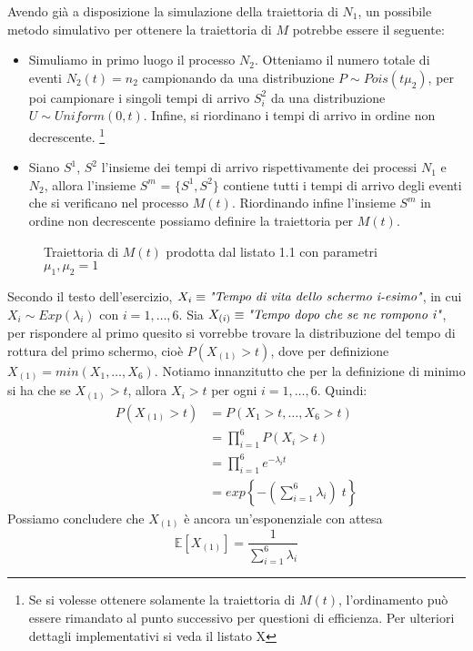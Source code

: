\documentclass{homework}
\begin{document}
\exercise*[2.c]
Avendo già a disposizione la simulazione della traiettoria di $N_1$, un possibile metodo simulativo per ottenere la traiettoria di $M$ potrebbe essere il seguente:
\begin{itemize}
    \item Simuliamo in primo luogo il processo $N_2$. Otteniamo il numero totale di eventi $N_2(t) = n_2$ campionando da una distribuzione $P \sim Pois(t \mu_2)$, per poi campionare i singoli tempi di arrivo $S^2_i$ da una distribuzione $U \sim Uniform(0, t)$. Infine, si riordinano i tempi di arrivo in ordine non decrescente.
    \footnote{Se si volesse ottenere solamente la traiettoria di $M(t)$, l'ordinamento può essere rimandato al punto successivo per questioni di efficienza. Per ulteriori dettagli implementativi si veda il listato X}
    \item Siano $S^1$, $S^2$ l'insieme dei tempi di arrivo rispettivamente dei processi $N_1$ e $N_2$, allora l'insieme $S^m$ = $\{S^1, S^2\}$  contiene tutti i tempi di arrivo degli eventi che si verificano nel processo $M(t)$.
    Riordinando infine l'insieme $S^m$ in ordine non decrescente possiamo definire la traiettoria per $M(t)$.
\end{itemize}

\begin{figure}[h]
    \centering
    
    \label{fig:my_label}
    \caption{Traiettoria di $M(t)$ prodotta dal listato 1.1 con parametri $\mu_1, \mu_2 = 1$ }
\end{figure}

\exercise*[3.a]
Secondo il testo dell'esercizio, $X_i \equiv \emph{"Tempo di vita dello schermo i-esimo"}$, in cui $X_i \sim Exp(\lambda_i)$ con $i = 1, \dots, 6$. Sia $X_{(i)} \equiv \emph{"Tempo dopo che se ne rompono i"}$, per rispondere al primo quesito si vorrebbe trovare la distribuzione del tempo di rottura del primo schermo, cioè $P(X_{(1)} > t)$, dove per definizione $X_{(1)} = min(X_1, \dots, X_6)$. Notiamo innanzitutto che per la definizione di minimo si ha che se $X_{(1)} > t$, allora $X_i > t$ per ogni $i=1, \dots, 6$. Quindi:
\[
\begin{align}
P(X_{(1)} > t) &= P(X_1 > t, \dots, X_6 > t)\\
              &= \prod_{i=1}^6 P(X_i > t)\\
              &= \prod_{i=1}^6 e^{-\lambda_i t}\\
              &= exp \left\{ -\left( \sum_{i=1}^6 \lambda_i \right) \;t \right\}
\end{align}
\]
Possiamo concludere che $X_{(1)}$ è ancora un'esponenziale con attesa
\[
\mathbb{E}[X_{(1)}] = \frac{1}{\sum_{i=1}^6 \lambda_i}
\]
\end{document}
